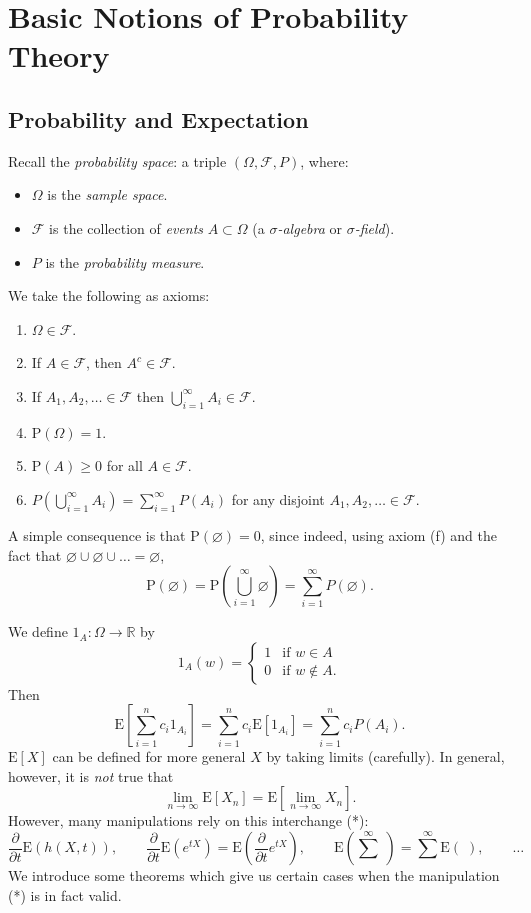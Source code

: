 \documentclass[english,12pt]{article}
\theoremstyle{plain}
\theoremstyle{definition}
\theoremstyle{definition} %
\newcommand{\enuma}[1]{\begin{enumerate}[label=(\alph{*})] #1 \end{enumerate}}
\newcommand{\R}{\mathbb{R}} %
\newcommand{\ex}[1]{\mbox{E} \left[ #1 \right]}
\begin{document}
\section{Basic Notions of Probability Theory}
\subsection{Probability and Expectation}
Recall the \emph{probability space}: a triple $(\Omega, \mathcal{F}, P)$, where:
\begin{itemize}
\item $\Omega$ is the \emph{sample space}.
\item $\mathcal{F}$ is the collection of \emph{events} $A \subset \Omega$ (a \emph{$\sigma$-algebra} or \emph{$\sigma$-field}).
\item $P$ is the \emph{probability measure}.
\end{itemize}
We take the following as axioms:

\enuma{
\item $\Omega \in \mathcal{F}$.
\item If $A \in \mathcal{F}$, then $A^c \in \mathcal{F}$.
\item If $A_1, A_2, \ldots \in \mathcal{F}$ then $\displaystyle \bigcup_{i=1}^\infty A_i \in \mathcal{F}$.
\item $\text{P}(\Omega) = 1$.
\item $\text{P}(A) \geq 0$ for all $A \in \mathcal{F}$.
\item $\displaystyle P \left( \bigcup_{i=1}^\infty A_i \right) = \sum_{i=1}^\infty P(A_i)$ for any disjoint $A_1, A_2, \ldots \in \mathcal{F}$.
}

A simple consequence is that $\text{P}(\varnothing) = 0$, since indeed, using axiom (f) and the fact that $\varnothing \cup \varnothing \cup \ldots = \varnothing$,
\[ \text{P}(\varnothing) = \text{P} \left( \bigcup_{i=1}^\infty \varnothing \right) = \sum_{i=1}^\infty P(\varnothing). \]

We define $1_A : \Omega \to \R$ by
\[ 1_A(w) = \begin{cases}
1 & \text{if } w \in A \\
0 & \text{if } w \notin A.
\end{cases} \]
Then
\[ \ex{ \sum_{i=1}^n c_i 1_{A_i}} = \sum_{i=1}^n c_i \ex{1_{A_i}} = \sum_{i=1}^n c_i P(A_i). \]
$\ex{X}$ can be defined for more general $X$ by taking limits (carefully). In general, however, it is \emph{not} true that
\[ \lim_{n \to \infty} \ex{X_n} = \ex{\lim_{n \to \infty} X_n}. \tag{*} \]
However, many manipulations rely on this interchange (*):
\[ \frac{\partial}{\partial t} \text{E}\left( h(X,t) \right), \qquad \frac{\partial}{\partial t} \text{E}(e^{tX}) = \text{E} \left( \frac{\partial}{\partial t} e^{tX} \right), \qquad \text{E} \left( \sum^\infty \; \right) = \sum^\infty \text{E}( \; ), \qquad \ldots \]
We introduce some theorems which give us certain cases when the manipulation (*) is in fact valid.
\end{document}
